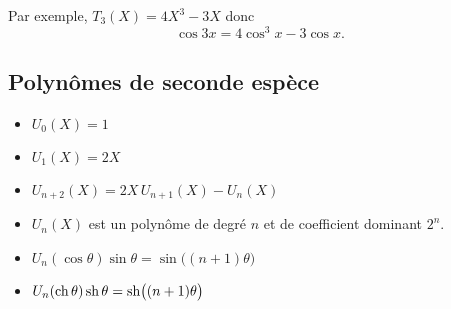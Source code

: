 \documentclass{yann}
\begin{document}
Par exemple, $T_3(X) = 4X^3 - 3X$ donc \[ \cos 3x = 4\cos^3 x - 3 \cos x. \]

\subsection{Polynômes de seconde espèce}

\begin{itemize}
\item
$U_0(X)      = 1$
\item
$U_1(X)      = 2X$
\item
$U_{n+2}(X)  = 2X \, U_{n+1}(X) - U_n(X)$
\item
$U_n(X)$ est un polynôme de degré $n$ et de coefficient dominant $2^n$.
\item
$U_n(\cos\theta)  \sin\theta  = \sin\bigl((n+1)\theta\bigr)$
\item
$U_n(\operatorname{ch}\theta) \operatorname{sh}\theta = \operatorname{sh}\bigl((n+1)\theta\bigr)$
\end{itemize}
\end{document}
